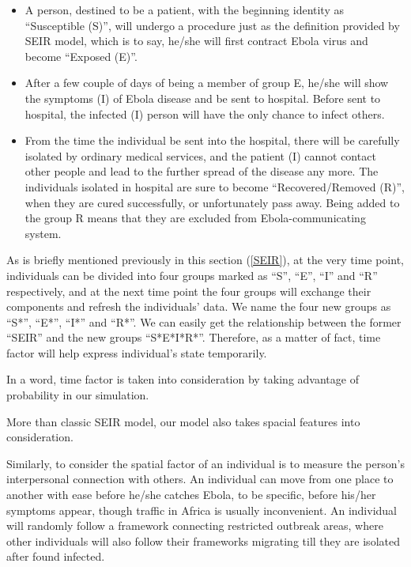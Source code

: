 \documentclass[11pt]{article}
\begin{document}
\begin{itemize}
\item A person, destined to be a patient, with the beginning identity as ``Susceptible (S)'', will undergo a procedure just as the definition provided by SEIR model, which is to say, he/she will first contract Ebola virus and become ``Exposed (E)''.

\item After a few couple of days of being a member of group E, he/she will show the symptoms (I) of Ebola disease and be sent to hospital. Before sent to hospital, the infected (I) person will have the only chance to infect others.

\item From the time the individual be sent into the hospital, there will be carefully isolated by ordinary medical services, and the patient (I) cannot contact other people and lead to the further spread of the disease any more. The individuals isolated in hospital are sure to become ``Recovered/Removed (R)'', when they are cured successfully, or unfortunately pass away. Being added to the group R means that they are excluded from Ebola-communicating system.
\end{itemize}

As is briefly mentioned previously in this section (\ref{SEIR}), at the very time point, individuals can be divided into four groups marked as ``S'', ``E'', ``I'' and ``R'' respectively, and at the next time point the four groups will exchange their components and refresh the individuals’ data. We name the four new groups as ``S*'', ``E*'', ``I*'' and ``R*''. We can easily get the relationship between the former ``SEIR'' and the new groups ``S*E*I*R*''. Therefore, as a matter of fact, time factor will help express individual’s state temporarily.

In a word, time factor is taken into consideration by taking advantage of probability in our simulation.

More than classic SEIR model, our model also takes spacial features into consideration.

Similarly, to consider the spatial factor of an individual is to measure the person’s interpersonal connection with others. An individual can move from one place to another with ease before he/she catches Ebola, to be specific, before his/her symptoms appear, though traffic in Africa is usually inconvenient. An individual will randomly follow a framework connecting restricted outbreak areas, where other individuals will also follow their frameworks migrating till they are isolated after found infected.
\end{document}
